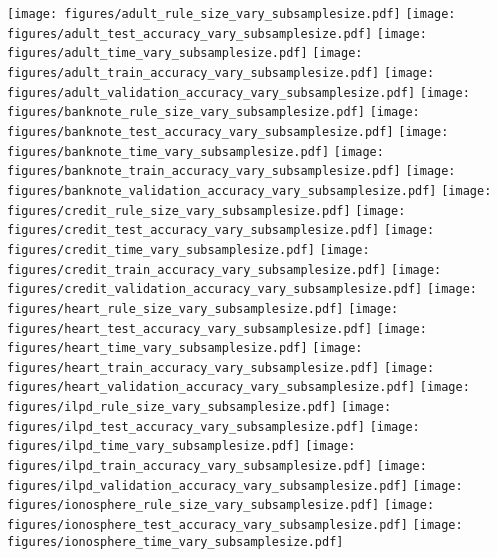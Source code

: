 \begin{figure*}
	\texttt{[image: figures/adult\_rule\_size\_vary\_subsamplesize.pdf]}
	\texttt{[image: figures/adult\_test\_accuracy\_vary\_subsamplesize.pdf]}
	\texttt{[image: figures/adult\_time\_vary\_subsamplesize.pdf]}
	\texttt{[image: figures/adult\_train\_accuracy\_vary\_subsamplesize.pdf]}
	\texttt{[image: figures/adult\_validation\_accuracy\_vary\_subsamplesize.pdf]}
	\texttt{[image: figures/banknote\_rule\_size\_vary\_subsamplesize.pdf]}
	\texttt{[image: figures/banknote\_test\_accuracy\_vary\_subsamplesize.pdf]}
	\texttt{[image: figures/banknote\_time\_vary\_subsamplesize.pdf]}
	\texttt{[image: figures/banknote\_train\_accuracy\_vary\_subsamplesize.pdf]}
	\texttt{[image: figures/banknote\_validation\_accuracy\_vary\_subsamplesize.pdf]}
	\texttt{[image: figures/credit\_rule\_size\_vary\_subsamplesize.pdf]}
	\texttt{[image: figures/credit\_test\_accuracy\_vary\_subsamplesize.pdf]}
	\texttt{[image: figures/credit\_time\_vary\_subsamplesize.pdf]}
	\texttt{[image: figures/credit\_train\_accuracy\_vary\_subsamplesize.pdf]}
	\texttt{[image: figures/credit\_validation\_accuracy\_vary\_subsamplesize.pdf]}
	\texttt{[image: figures/heart\_rule\_size\_vary\_subsamplesize.pdf]}
	\texttt{[image: figures/heart\_test\_accuracy\_vary\_subsamplesize.pdf]}
	\texttt{[image: figures/heart\_time\_vary\_subsamplesize.pdf]}
	\texttt{[image: figures/heart\_train\_accuracy\_vary\_subsamplesize.pdf]}
	\texttt{[image: figures/heart\_validation\_accuracy\_vary\_subsamplesize.pdf]}
	\texttt{[image: figures/ilpd\_rule\_size\_vary\_subsamplesize.pdf]}
	\texttt{[image: figures/ilpd\_test\_accuracy\_vary\_subsamplesize.pdf]}
	\texttt{[image: figures/ilpd\_time\_vary\_subsamplesize.pdf]}
	\texttt{[image: figures/ilpd\_train\_accuracy\_vary\_subsamplesize.pdf]}
	\texttt{[image: figures/ilpd\_validation\_accuracy\_vary\_subsamplesize.pdf]}
	\texttt{[image: figures/ionosphere\_rule\_size\_vary\_subsamplesize.pdf]}
	\texttt{[image: figures/ionosphere\_test\_accuracy\_vary\_subsamplesize.pdf]}
	\texttt{[image: figures/ionosphere\_time\_vary\_subsamplesize.pdf]}

\end{figure*}
